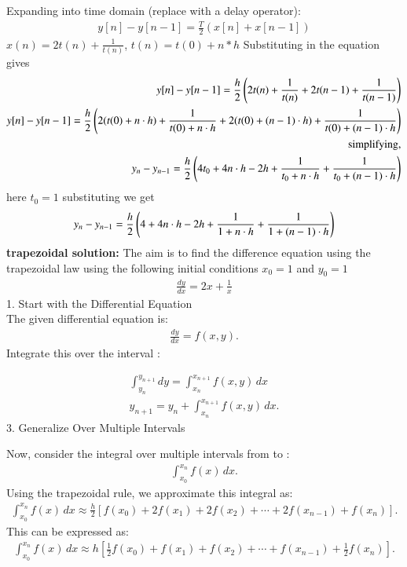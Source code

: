 \documentclass[journal]{IEEEtran}
\begin{document}
Expanding into time domain (replace  with a delay operator):
\begin{align}
    y[n] - y[n-1] = \frac{T}{2}\left(x[n] + x[n-1]\right)
\end{align}
$x(n) = 2t(n) +\frac{1}{t(n)}$,  $t(n) = t(0) + n*h$
Substituting in the equation gives 
\begin{align}
y[n] - y[n-1] = \frac{h}{2}\left(2t(n) +\frac{1}{t(n)} + 2t(n-1) + \frac{1}{t(n-1)}\right)\\
y[n] - y[n-1] = \frac{h}{2}\left(2(t(0)+n\cdot h)+\frac{1}{t(0)+n\cdot h}+2(t(0)+(n-1) \cdot h)+ \frac{1}{t(0)+(n-1) \cdot h}\right)\\
\text{simplifying,}\\
y_{n} - y_{n-1} = \frac{h}{2}\left(4t_0 + 4n\cdot h -2h + \frac{1}{t_0 + n\cdot h} + \frac{1}{t_0 + (n-1)\cdot h}\right)
\end{align}
here $t_0 = 1$ substituting we get 
\begin{align}
y_{n} - y_{n-1} = \frac{h}{2}\left(4 + 4n\cdot h -2h + \frac{1}{1 + n\cdot h} + \frac{1}{1 + (n-1)\cdot h}\right)
\end{align}
\textbf{trapezoidal solution:}
The aim is to find the difference equation using the trapezoidal law using the following  initial conditions $x_0 = 1$ and $y_0 = 1$
\begin{align}
  \frac{dy}{dx} = 2x + \frac{1}{x}
\end{align}
1. Start with the Differential Equation\\
The given differential equation is:
\begin{align}
    \frac{dy}{dx} = f(x, y).
\end{align}
Integrate this over the interval :

\begin{align}
\int_{y_n}^{y_{n+1}} dy = \int_{x_n}^{x_{n+1}} f(x, y) \, dx\\
y_{n+1} = y_n + \int_{x_n}^{x_{n+1}} f(x, y) \, dx.
\end{align}
3. Generalize Over Multiple Intervals

Now, consider the integral over multiple intervals from  to :
\begin{align}
\int_{x_0}^{x_n} f(x) \, dx.
\end{align}
Using the trapezoidal rule, we approximate this integral as:
\begin{align}
\int_{x_0}^{x_n} f(x) \, dx \approx \frac{h}{2} \left[ f(x_0) + 2f(x_1) + 2f(x_2) + \cdots + 2f(x_{n-1}) + f(x_n) \right].
\end{align}
This can be expressed as:
\begin{align}
\int_{x_0}^{x_n} f(x) \, dx \approx h \left[ \frac{1}{2} f(x_0) + f(x_1) + f(x_2) + \cdots + f(x_{n-1}) + \frac{1}{2} f(x_n) \right].
\end{align}
\end{document}
